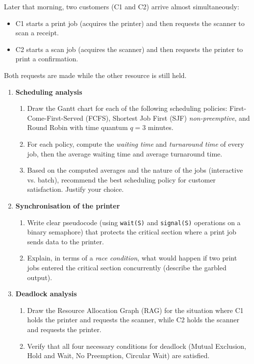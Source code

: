 \documentclass[11pt]{article}
\newcounter{popsec}
\newcounter{popsub}
\newcommand{\courssub}[1]{%
  \stepcounter{popsub}%
  \par\vspace{9pt}\noindent{\popxbold\fontsize{11.5}{13}\selectfont\color{popink}{\color{poporange}\thepopsec.\thepopsub}\hspace{6pt}#1}\par\nopagebreak\vspace{4pt}
}
\begin{document}
Later that morning, two customers (C1 and C2) arrive almost simultaneously:
\begin{itemize}
    \item C1 starts a print job (acquires the printer) and then requests the scanner to scan a receipt.
    \item C2 starts a scan job (acquires the scanner) and then requests the printer to print a confirmation.
\end{itemize}
Both requests are made while the other resource is still held.

\courssub{Tasks}
\begin{enumerate}
    \item \textbf{Scheduling analysis}
    \begin{enumerate}
        \item Draw the Gantt chart for each of the following scheduling policies: First-Come-First-Served (FCFS), Shortest Job First (SJF) \emph{non-preemptive}, and Round Robin with time quantum $q = 3$ minutes.
        \item For each policy, compute the \emph{waiting time} and \emph{turnaround time} of every job, then the average waiting time and average turnaround time.
        \item Based on the computed averages and the nature of the jobs (interactive vs. batch), recommend the best scheduling policy for customer satisfaction. Justify your choice.
    \end{enumerate}
    \item \textbf{Synchronisation of the printer}
    \begin{enumerate}
        \item Write clear pseudocode (using \texttt{wait(S)} and \texttt{signal(S)} operations on a binary semaphore) that protects the critical section where a print job sends data to the printer.
        \item Explain, in terms of a \emph{race condition}, what would happen if two print jobs entered the critical section concurrently (describe the garbled output).
    \end{enumerate}
    \item \textbf{Deadlock analysis}
    \begin{enumerate}
        \item Draw the Resource Allocation Graph (RAG) for the situation where C1 holds the printer and requests the scanner, while C2 holds the scanner and requests the printer.
        \item Verify that all four necessary conditions for deadlock (Mutual Exclusion, Hold and Wait, No Preemption, Circular Wait) are satisfied.

\end{enumerate}
\end{enumerate}
\end{document}
